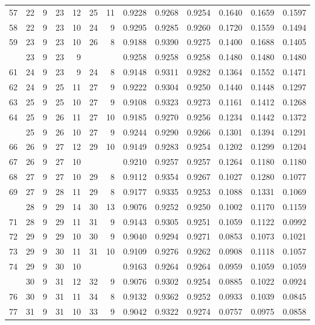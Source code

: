\begin{Schunk}
\begin{longtable}{rrrrrrrrrrrrr}
57 & 22 & 9 & 23 & 12 & 25 & 11 & 0.9228 & 0.9268 & 0.9254 & 0.1640 & 0.1659 & 0.1597\\
58 & 22 & 9 & 23 & 10 & 24 & 9 & 0.9295 & 0.9285 & 0.9260 & 0.1720 & 0.1559 & 0.1494\\
59 & 23 & 9 & 23 & 10 & 26 & 8 & 0.9188 & 0.9390 & 0.9275 & 0.1400 & 0.1688 & 0.1405\\
\addlinespace
60 & 23 & 9 & 23 & 9 &  &  & 0.9258 & 0.9258 & 0.9258 & 0.1480 & 0.1480 & 0.1480\\
61 & 24 & 9 & 23 & 9 & 24 & 8 & 0.9148 & 0.9311 & 0.9282 & 0.1364 & 0.1552 & 0.1471\\
62 & 24 & 9 & 25 & 11 & 27 & 9 & 0.9222 & 0.9304 & 0.9250 & 0.1440 & 0.1448 & 0.1297\\
63 & 25 & 9 & 25 & 10 & 27 & 9 & 0.9108 & 0.9323 & 0.9273 & 0.1161 & 0.1412 & 0.1268\\
64 & 25 & 9 & 26 & 11 & 27 & 10 & 0.9185 & 0.9270 & 0.9256 & 0.1234 & 0.1442 & 0.1372\\
\addlinespace
65 & 25 & 9 & 26 & 10 & 27 & 9 & 0.9244 & 0.9290 & 0.9266 & 0.1301 & 0.1394 & 0.1291\\
66 & 26 & 9 & 27 & 12 & 29 & 10 & 0.9149 & 0.9283 & 0.9254 & 0.1202 & 0.1299 & 0.1204\\
67 & 26 & 9 & 27 & 10 &  &  & 0.9210 & 0.9257 & 0.9257 & 0.1264 & 0.1180 & 0.1180\\
68 & 27 & 9 & 27 & 10 & 29 & 8 & 0.9112 & 0.9354 & 0.9267 & 0.1027 & 0.1280 & 0.1077\\
69 & 27 & 9 & 28 & 11 & 29 & 8 & 0.9177 & 0.9335 & 0.9253 & 0.1088 & 0.1331 & 0.1069\\
\addlinespace
70 & 28 & 9 & 29 & 14 & 30 & 13 & 0.9076 & 0.9252 & 0.9250 & 0.1002 & 0.1170 & 0.1159\\
71 & 28 & 9 & 29 & 11 & 31 & 9 & 0.9143 & 0.9305 & 0.9251 & 0.1059 & 0.1122 & 0.0992\\
72 & 29 & 9 & 29 & 10 & 30 & 9 & 0.9040 & 0.9294 & 0.9271 & 0.0853 & 0.1073 & 0.1021\\
73 & 29 & 9 & 30 & 11 & 31 & 10 & 0.9109 & 0.9276 & 0.9262 & 0.0908 & 0.1118 & 0.1057\\
74 & 29 & 9 & 30 & 10 &  &  & 0.9163 & 0.9264 & 0.9264 & 0.0959 & 0.1059 & 0.1059\\
\addlinespace
75 & 30 & 9 & 31 & 12 & 32 & 9 & 0.9076 & 0.9302 & 0.9254 & 0.0885 & 0.1022 & 0.0924\\
76 & 30 & 9 & 31 & 11 & 34 & 8 & 0.9132 & 0.9362 & 0.9252 & 0.0933 & 0.1039 & 0.0845\\
77 & 31 & 9 & 31 & 10 & 33 & 9 & 0.9042 & 0.9322 & 0.9274 & 0.0757 & 0.0975 & 0.0858\\

\end{longtable}
\end{Schunk}
